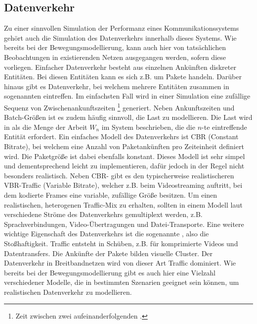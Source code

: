 \documentclass[12pt, a4paper]{article}
\begin{document}
\pagebreak

\subsection{Datenverkehr}
\label{sec:traffic}

Zu einer sinnvollen Simulation der Performanz eines Kommunikationssystems gehört auch die Simulation des Datenverkehrs
innerhalb dieses Systems. Wie bereits bei der Bewegungsmodellierung, kann auch hier von tatsächlichen Beobachtungen in
existierenden Netzen ausgegangen werden, sofern diese vorliegen.
\newline\newline
Einfacher Datenverkehr besteht aus einzelnen Ankünften diskreter Entitäten.
Bei diesen Entitäten kann es sich z.B. um Pakete handeln. Darüber hinaus gibt es Datenverkehr, 
bei welchem mehrere Entitäten zusammen in sogenannten  eintreffen.
Im einfachsten Fall wird in einer Simulation eine zufällige Sequenz von Zwischenankunftszeiten \footnote{Zeit zwischen zwei 
aufeinanderfolgenden .} generiert. Neben Ankunftszeiten und Batch-Größen ist es zudem häufig sinnvoll,
die Last zu modellieren. \cite{Frost1994} Die Last wird in \cite{Frost1994} als die Menge der Arbeit $W_n$ im System beschrieben,
die die $n$-te eintreffende Entität erfordert.
\newline\newline
Ein einfaches Modell des Datenverkehrs ist \textsc{CBR} (Constant Bitrate), bei welchem eine Anzahl von Paketankünften
pro Zeiteinheit definiert wird. Die Paketgröße ist dabei ebenfalls konstant. Dieses Modell ist sehr simpel und dementsprechend
leicht zu implementieren, dafür jedoch in der Regel nicht besonders realistisch.\newline
Neben \textsc{CBR}- gibt es den typischerweise realistischeren \textsc{VBR}-Traffic (Variable Bitrate), 
welcher z.B. beim Videostreaming auftritt, bei dem kodierte Frames eine variable, zufällige Größe besitzen.\cite{Frost1994}
Um einen realistischen, heterogenen Traffic-Mix zu erhalten, sollten in einem Modell laut \cite{Frost1994} verschiedene
Ströme des Datenverkehrs gemultiplext werden, z.B. Sprachverbindungen, Video-Übertragungen und Datei-Transporte.
\newline\newline
Eine weitere wichtige Eigenschaft des Datenverkehrs ist die sogenannte , also die Stoßhaftigkeit.
Traffic entsteht in Schüben, z.B. für komprimierte Videos und Datentransfers. Die Ankünfte der Pakete bilden visuelle
Cluster. Der Datenverkehr in Breitbandnetzen wird von dieser Art Traffic dominiert. \cite{Frost1994}
\newline\newline
Wie bereits bei der Bewegungsmodellierung gibt es auch hier eine Vielzahl verschiedener Modelle, die in bestimmten Szenarien
geeignet sein können, um realistischen Datenverkehr zu modellieren.
\end{document}
